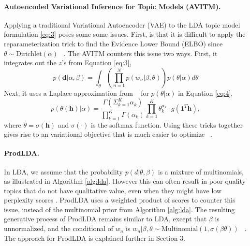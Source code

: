 \documentclass[10pt,twocolumn,letterpaper]{article}
\begin{document}
\paragraph{Autoencoded Variational Inference for Topic Models (AVITM).}
Applying a traditional Variational Autoencoder (VAE) to the LDA topic model formulation \eqref{eq:3} poses some some issues.
First, is that it is difficult to apply the reparameterization trick to find the Evidence Lower Bound (ELBO) since $\theta \sim \text{Dirichlet}(\alpha)$ ~\cite{srivastava2017autoencoding}.
The AVITM counters this issue two ways.
First, it integrates out the $z$'s from Equation \eqref{eq:3},
\begin{equation}\label{eq:4}
    p(\bm{d}|\alpha,\beta) = \int_{\theta} \left(\prod_{n=1}^{N}  p(w_n|\beta,\theta)\right) p(\theta|\alpha)d\theta
\end{equation}
Next, it uses a Laplace approximation from ~\cite{hennig2012kernel} for $p(\theta|\alpha)$ in Equation \ref{eq:4},
\begin{equation}\label{eq:laplace}
    p(\theta(\bm{h})|\alpha) = \frac{\Gamma(\Sigma_{k=1}^{K} \alpha_k)}{\prod_{k=1}^{K} \Gamma(\alpha_k)} \prod_{k=1}^{K} \theta_{k}^{\alpha_k} \cdot g(\bm{1}^T \bm{h}),
\end{equation}
where $\theta = \sigma(\bm{h})$ and $\sigma(\cdot)$ is the softmax function.
Using these tricks together gives rise to an variational objective that is much easier to optimize ~\cite{srivastava2017autoencoding}.

\paragraph{ProdLDA.}
In LDA, we assume that the probability $p(d|\theta,\beta)$ is a mixture of multinomials, as illustrated in Algorithm \ref{alg:lda}.
However this can often result in poor quality topics that do not have qualitative value, even when they might have low perplexity scores \cite{chang2009reading,hinton2009replicated}.
ProdLDA uses a weighted product of scores to counter this issue, instead of the multinomial prior from Algorithm \ref{alg:lda}.
The resulting generative process of ProdLDA remains similar to LDA, except that $\beta$ is unnormalized, and the conditional of $w_n$ is $w_n | \beta,\theta \sim \text{Multinomial}(1,\sigma(\beta \theta))$ ~\cite{srivastava2017autoencoding}.
The approach for ProdLDA is explained further in Section 3.
\end{document}
